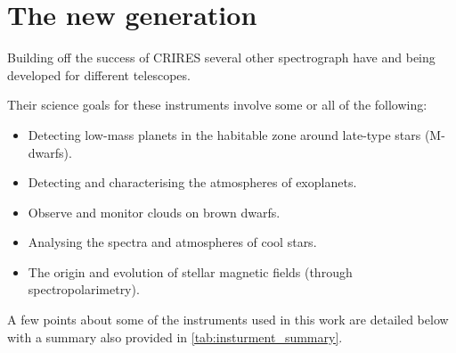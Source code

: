 \section{The new generation}
\label{subsec:new_generation}
Building off the success of CRIRES several other \nir{} spectrograph have and being developed for different telescopes.

Their science goals for these instruments involve some or all of the following:

\begin{itemize}
\item Detecting low-mass planets in the habitable zone around late-type stars (M-dwarfs).
\item Detecting and characterising the atmospheres of exoplanets.
\item Observe and monitor clouds on brown dwarfs.
\item Analysing the spectra and atmospheres of cool stars.
\item The origin and evolution of stellar magnetic fields (through spectropolarimetry).
\end{itemize}

A few points about some of the \nir{} instruments used in this work are detailed below with a summary also provided in \cref{tab:insturment_summary}.

